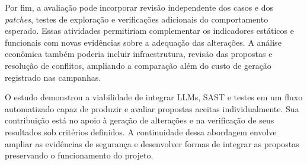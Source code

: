 Por fim, a avaliação pode incorporar revisão independente dos casos e dos \textit{patches}, testes de exploração e verificações adicionais do comportamento esperado. Essas atividades permitiriam complementar os indicadores estáticos e funcionais com novas evidências sobre a adequação das alterações. A análise econômica também poderia incluir infraestrutura, revisão das propostas e resolução de conflitos, ampliando a comparação além do custo de geração registrado nas campanhas.

O estudo demonstrou a viabilidade de integrar LLMs, SAST e testes em um fluxo automatizado capaz de produzir e avaliar propostas aceitas individualmente. Sua contribuição está no apoio à geração de alterações e na verificação de seus resultados sob critérios definidos. A continuidade dessa abordagem envolve ampliar as evidências de segurança e desenvolver formas de integrar as propostas preservando o funcionamento do projeto.
